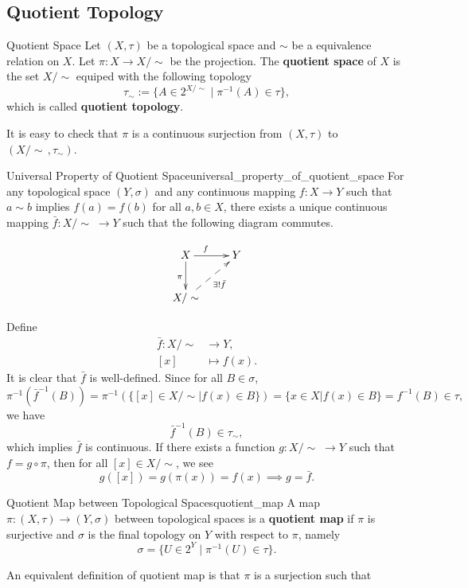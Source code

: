 \documentclass{report}
\begin{document}
\subsection{Quotient Topology}
\begin{definition}{Quotient Space}{}
	Let $(X,\tau)$ be a topological space and $\sim$ be a equivalence relation on $X$. Let $\pi:X\to X/\sim$ be the projection.
	The \textbf{quotient space} of $X$ is the set $X/\sim$ equiped with the following topology
	\[
		\tau_\sim:=\{A\in 2^{X/\sim}\mid \pi^{-1}(A)\in \tau\},
	\]
	which is called \textbf{quotient topology}.
\end{definition}


It is easy to check that $\pi$ is a continuous surjection from $(X,\tau)$ to $(X/\sim\,,\tau_\sim)$.

\begin{proposition}{Universal Property of Quotient Space}{universal_property_of_quotient_space}
	For any topological space $(Y,\sigma)$ and any continuous mapping $f:X\to Y$ such that $a\sim b$ implies $f(a) = f(b)$ for all $a,b \in X$, there exists a unique continuous mapping $\bar{f}:X/\sim\;\to Y$ such that the following diagram commutes.

	\[\xymatrix{
		X\ar[r]^{f\quad}\ar[d]_{\pi}  &Y\\
		X/\sim\ar@{-->}[ru]_{\exists!\bar{f}}&
		}\]
\end{proposition}



\begin{prf}
	Define
	\begin{align*}
		\bar{f}:X/\sim & \longrightarrow Y, \\
		[x]            & \longmapsto f(x).
	\end{align*}
	It is clear that $\bar{f}$ is well-defined. Since for all $B\in \sigma$,
	\[
		\pi^{-1}\left(\bar{f}^{-1}(B)\right)=\pi^{-1}\left(\{[x]\in X/\sim| f(x)\in B\}\right)=\{x\in X| f(x)\in B\}=f^{-1}(B)\in \tau,
	\]
	we have
	\[
		\bar{f}^{-1}(B)\in \tau_\sim,
	\]
	which implies $\bar{f}$ is continuous. If there exists a function $g:X/\sim\;\to Y$ such that $f=g\circ\pi$, then for all $[x]\in X/\sim$, we see
	\[
		g([x])=g(\pi(x))=f(x)\implies g=\bar{f}.
	\]
\end{prf}

\begin{definition}{Quotient Map between Topological Spaces}{quotient_map}
	A map $\pi:(X,\tau)\to (Y,\sigma)$ between topological spaces is a \textbf{quotient map} if $\pi$ is surjective and $\sigma$ is the final topology on $Y$ with respect to $\pi$, namely
	\[
	\sigma=\{U\in 2^Y\mid \pi^{-1}(U)\in \tau\}.
	\]
\end{definition}
\begin{remark}
	An equivalent definition of quotient map is that $\pi$ is a surjection such that 
\end{remark}
\end{document}
